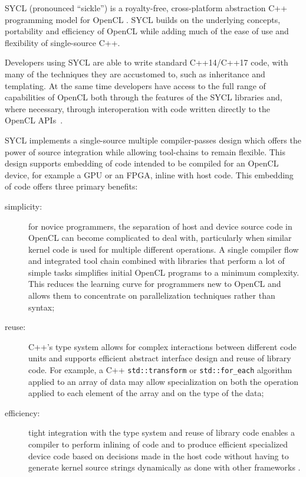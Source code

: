\documentclass[sigplan, review, authordraft]{acmart}
\begin{document}
SYCL \cite{SYCL-1.2.1,SYCL-2.2-provisional} (pronounced ``sickle'') is a
royalty-free, cross-platform abstraction C++ programming model for
OpenCL \cite{OpenCL-API-2.2-provisional,
  OpenCL-C++-2.2-provisional}. SYCL builds on the underlying concepts,
portability and efficiency of OpenCL while adding much of the ease of
use and flexibility of single-source C++.

Developers using SYCL are able to write standard C++14/C++17 code,
with many of the techniques they are accustomed to, such as
inheritance and templating. At the same time developers have access to
the full range of capabilities of OpenCL both through the features of
the SYCL libraries and, where necessary, through interoperation with
code written directly to the OpenCL
APIs~\cite{OpenCL-API-2.2-provisional}.

SYCL implements a single-source multiple compiler-passes design which
offers the power of source integration while allowing tool-chains to
remain flexible. This design supports embedding of code intended to be
compiled for an OpenCL device, for example a GPU or an FPGA, inline
with host code. This embedding of code offers three primary benefits:
\begin{description}
\item[simplicity:] for novice programmers, the separation of host and
  device source code in OpenCL can become complicated to deal with,
  particularly when similar kernel code is used for multiple different
  operations. A single compiler flow and integrated tool chain
  combined with libraries that perform a lot of simple tasks
  simplifies initial OpenCL programs to a minimum complexity. This
  reduces the learning curve for programmers new to OpenCL and allows
  them to concentrate on parallelization techniques rather than
  syntax;
\item[reuse:] C++'s type system allows for complex interactions
  between different code units and supports efficient abstract
  interface design and reuse of library code.  For example, a C++
  \lstinline{std::transform} or \lstinline{std::for_each} algorithm
  applied to an array of data may allow specialization on both the
  operation applied to each element of the array and on the type of
  the data;
\item[efficiency:] tight integration with the type system and reuse of
  library code enables a compiler to perform inlining of code and to
  produce efficient specialized device code based on decisions made in
  the host code without having to generate kernel source strings
  dynamically as done with other frameworks \cite{VexCL,
    Boost.Compute}.
\end{description}
\end{document}
